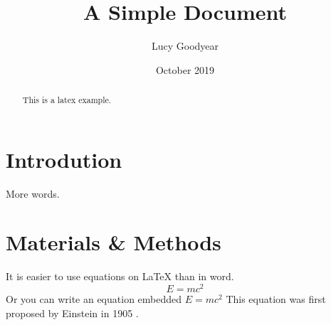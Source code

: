 \documentclass[12pt]{article}
\title{A Simple Document}
\author{Lucy Goodyear}
\date{October 2019}
\begin{document}
	\maketitle
	
	\begin{abstract}
		This is a latex example.
	\end{abstract}
	
	\section{Introdution}
		More words.
	
	\section{Materials \& Methods}
		It is easier to use equations on LaTeX than in word.
		\begin{equation}
		E=mc^2
		\end{equation}
		Or you can write an equation embedded $E=mc^{2}$
		This equation was first proposed by Einstein in 1905 \cite{einstein1905does}.
	
	
	
	
\end{document}
